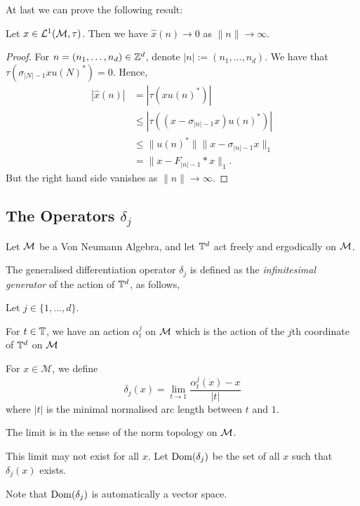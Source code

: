 At last we can prove the following result:
\begin{proposition}
    Let $x \in \mathcal{L}^1(\mathcal{M},\tau)$. Then we have $\hat{x}(n) \rightarrow 0$
    as $\|n\|\rightarrow\infty$.
\end{proposition}
\begin{proof}
    For $n = (n_1,\ldots,n_d) \in \mathbb{Z}^d$, denote $|n| := (n_1,\ldots,n_d)$.
    We have that $\tau(\sigma_{|N|-1}xu(N)^*) = 0$. Hence,
    \begin{align}
        |\hat{x}(n)| &= |\tau(xu(n)^*)|\\
&\leq |\tau((x-\sigma_{|n|-1}x)u(n)^*)|\\
&\leq \|u(n)^*\|\|x-\sigma_{|n|-1}x\|_1\\
&= \|x-F_{|n|-1}*x\|_1.
    \end{align}
    But the right hand side vanishes as $\|n\|\rightarrow\infty$.
\end{proof}

\subsection{The Operators $\delta_j$}
Let $\mathcal{M}$ be a Von Neumann Algebra, and let $\mathbb{T}^d$
act freely and ergodically on $\mathcal{M}$. 

The generalised differentiation operator $\delta_j$ is defined
as the \emph{infinitesimal generator} of the action of $\mathbb{T}^d$, as follows,
\begin{definition}
    Let $j \in \{1,\ldots,d\}$. 
    
    For $t \in \mathbb{T}$, we have an action $\alpha^j_t$ on $\mathcal{M}$
    which is the action of the $j$th coordinate of $\mathbb{T}^d$ on $\mathcal{M}$
    
    For $x \in \mathcal{M}$, we define 
    \begin{equation}
        \delta_j(x) = \lim_{t\rightarrow 1} \frac{\alpha^j_t(x)-x}{|t|}
    \end{equation}
    where $|t|$ is the minimal normalised arc length between $t$ and $1$.
    
    The limit is in the sense of the norm topology on $\mathcal{M}$.
    
    This limit may not exist for all $x$. Let $\operatorname{Dom}(\delta_j)$
    be the set of all $x$ such that $\delta_j(x)$ exists.
\end{definition}
Note that $\operatorname{Dom}(\delta_j)$ is automatically a vector space.



